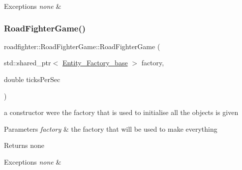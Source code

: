 \begin{DoxyExceptions}{Exceptions}
{\em none} & \\
\hline
\end{DoxyExceptions}
\mbox{\label{classroadfighter_1_1RoadFighterGame_a62e5d9d595ca8ec77f0f2d0078a7078f}} 
\subsubsection{\texorpdfstring{Road\+Fighter\+Game()}{RoadFighterGame()}\hspace{0.1cm}{\footnotesize\ttfamily [2/4]}}
{\footnotesize\ttfamily roadfighter\+::\+Road\+Fighter\+Game\+::\+Road\+Fighter\+Game (\begin{DoxyParamCaption}\item[{std\+::shared\+\_\+ptr$<$ \hyperlink{classroadfighter_1_1Entity__Factory__base}{Entity\+\_\+\+Factory\+\_\+base} $>$}]{factory,  }\item[{double}]{ticks\+Per\+Sec }\end{DoxyParamCaption})\hspace{0.3cm}{\ttfamily [explicit]}}

a constructor were the factory that is used to initialise all the objects is given 
\begin{DoxyParams}{Parameters}
{\em factory} & the factory that will be used to make everything \\
\hline
\end{DoxyParams}
\begin{DoxyReturn}{Returns}
none 
\end{DoxyReturn}

\begin{DoxyExceptions}{Exceptions}
{\em none} & \\
\hline
\end{DoxyExceptions}
\mbox{\label{classroadfighter_1_1RoadFighterGame_a972a332abf53705ac2e6b11cf4c446aa}} 
